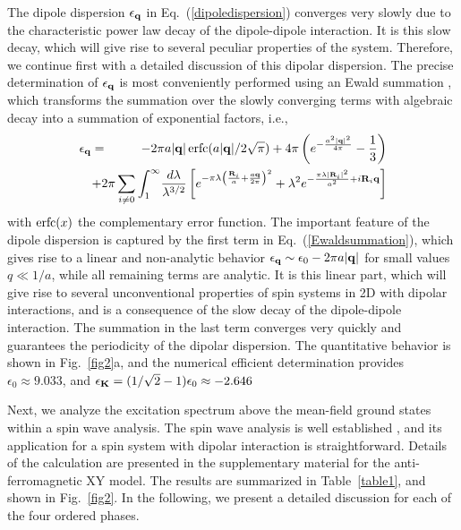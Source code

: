 The dipole dispersion $\epsilon_{\bf q}$ in Eq.~(\ref{dipoledispersion})
converges very slowly due to the characteristic power law decay of the dipole-dipole
interaction. It is this slow decay, which will give rise to several peculiar
properties of the system. Therefore, we continue first with a detailed discussion
of this dipolar dispersion.  The precise determination of $\epsilon_{\bf q}$ is
most conveniently performed using an Ewald summation \cite{bonsall59}, which transforms
the summation over the  slowly converging terms with algebraic decay into a summation of exponential factors, i.e.,
%
\begin{eqnarray}
   \epsilon_{\bf q}  & = & - 2 \pi a | {\bf q}|\,{\rm erfc}(a |{\bf q}|/2\sqrt{\pi})   + 4 \pi \left( e^{- \frac{a^2 |{\bf q}|^2}{4 \pi}} - \frac{1}{3}\right)      \label{Ewaldsummation} 
\\
   & & \hspace{-20pt}+     2 \pi \sum_{i\neq 0} \int_{1}^{\infty} \! \frac{d \lambda}{ \lambda^{3/2}} \left[ e^{- \pi  \lambda \left(\frac{ {\bf R}_{i}}{a} + \frac{a {\bf q}}{2 \pi}\right)^2} +\lambda^{2}  e^{- \frac{\pi \lambda |{\bf R}_{i}|^2}{a^2}+ i {\bf R}_{i}{\bf q}}\right] \nonumber
   \end{eqnarray} 
%
with ${\rm erfc}(x)$ the complementary error function. The important feature of the dipole
dispersion is captured by the first term in Eq.~(\ref{Ewaldsummation}), which
gives rise to a linear and non-analytic behavior $\epsilon_{\bf q} \sim
\epsilon_{0} - 2 \pi a |{\bf q}|$ for small values $q \ll 1/a $, while all
remaining terms are analytic. It is this linear part, which will give rise to
several unconventional properties of spin systems in 2D with dipolar
interactions, and is a consequence of the slow decay of the dipole-dipole
interaction. The summation in the last term converges very quickly and
guarantees the periodicity of the dipolar dispersion. The quantitative behavior
is shown in Fig.~\ref{fig2}a, and the numerical efficient determination provides
$\epsilon_{0}\approx 9.033$, and $\epsilon_{\bf K}=(1/\sqrt{2}-1)  \epsilon_{0}
\approx -2.646$



Next, we analyze the excitation spectrum above the mean-field ground states
within a spin wave analysis. The spin wave analysis is well
established \cite{kubo52,auerbachbook}, and its application for a spin system with dipolar
interaction is straightforward. Details of the calculation are presented in
the supplementary material for the anti-ferromagnetic XY model. The results are
summarized in Table~\ref{table1}, and shown in Fig.~\ref{fig2}. In the following, we present a detailed
discussion for each of the four ordered phases.




